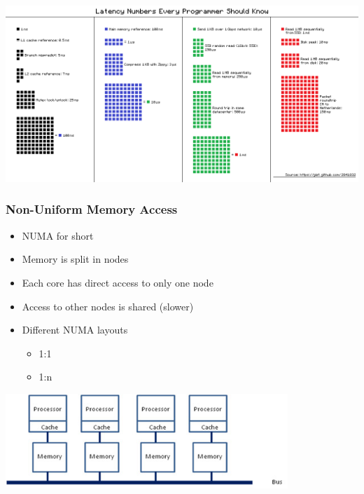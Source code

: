 \begin{frame}
  \frametitle{}

  \begin{center}
    \includegraphics[width=1\textwidth,height=1\textheight,keepaspectratio]{img/latency.png}
  \end{center}

\end{frame}

\begin{frame}
  \frametitle{Non-Uniform Memory Access}

  \begin{itemize}
  \item NUMA for short
  \item Memory is split in nodes
  \item Each core has direct access to only one node
  \item Access to other nodes is shared (slower)
  \item Different NUMA layouts
    \begin{itemize}
    \item 1:1
    \item 1:n
    \end{itemize}
  \end{itemize}

  \begin{center}
    \includegraphics[width=0.8\textwidth,height=0.5\textheight,keepaspectratio]{img/numa.jpg}
  \end{center}
\end{frame}


